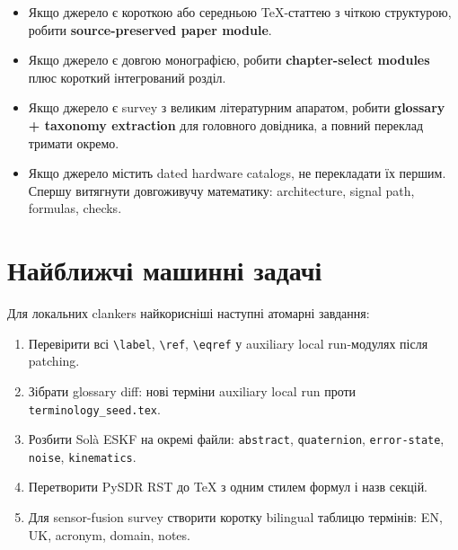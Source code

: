 \begin{itemize}
\item Якщо джерело є короткою або середньою TeX-статтею з чіткою структурою, робити \textbf{source-preserved paper module}.
\item Якщо джерело є довгою монографією, робити \textbf{chapter-select modules} плюс короткий інтегрований розділ.
\item Якщо джерело є survey з великим літературним апаратом, робити \textbf{glossary + taxonomy extraction} для головного довідника, а повний переклад тримати окремо.
\item Якщо джерело містить dated hardware catalogs, не перекладати їх першим. Спершу витягнути довгоживучу математику: architecture, signal path, formulas, checks.
\end{itemize}

\section{Найближчі машинні задачі}

Для локальних clankers найкорисніші наступні атомарні завдання:

\begin{enumerate}[label=\arabic*.]
\item Перевірити всі \verb|\label|, \verb|\ref|, \verb|\eqref| у auxiliary local run-модулях після patching.
\item Зібрати glossary diff: нові терміни auxiliary local run проти \texttt{terminology\_seed.tex}.
\item Розбити Solà ESKF на окремі файли: \texttt{abstract}, \texttt{quaternion}, \texttt{error-state}, \texttt{noise}, \texttt{kinematics}.
\item Перетворити PySDR RST до TeX з одним стилем формул і назв секцій.
\item Для sensor-fusion survey створити коротку bilingual таблицю термінів: EN, UK, acronym, domain, notes.
\end{enumerate}
